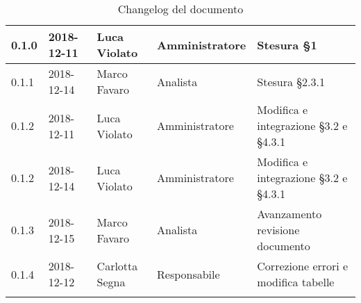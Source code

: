 \begin{center}
\begin{longtable}[c]{|m{}|m{}|m{}|m{}|p{}|}
\hline
\rowcolor{grigio}0.1.0 & 2018-12-11 & Luca Violato & Amministratore & Stesura §1\\
\hline
0.1.1 & 2018-12-14 & Marco Favaro & Analista & Stesura §2.3.1\\
\hline
\rowcolor{grigio}0.1.2 & 2018-12-11 & Luca Violato & Amministratore & Modifica e integrazione §3.2 e §4.3.1\\
0.1.2 & 2018-12-14 & Luca Violato & Amministratore & Modifica e integrazione §3.2 e §4.3.1\\
\hline
0.1.3 & 2018-12-15 & Marco Favaro & Analista & Avanzamento revisione documento\\
\hline
0.1.4 & 2018-12-12 & Carlotta Segna & Responsabile & Correzione errori e modifica tabelle \\
\caption{Changelog del documento}
\end{longtable}
\end{center}